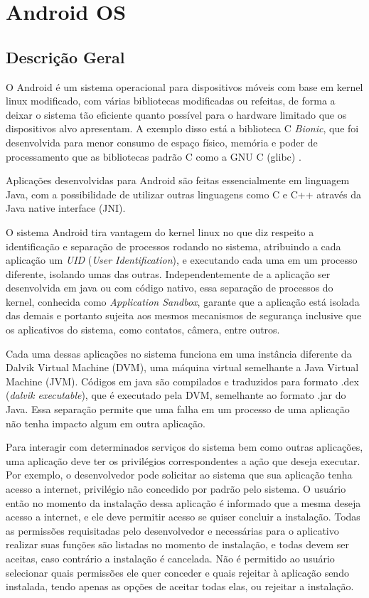 \chapter[Android OS]{Android OS\footnotemark}
\label{cap:android-os}

\section{Descrição Geral}
O Android é um sistema operacional para dispositivos móveis com base em kernel linux modificado, com várias bibliotecas modificadas ou refeitas, de forma a deixar o sistema tão eficiente quanto possível para o hardware limitado que os dispositivos alvo apresentam. A exemplo disso está a biblioteca C \textit{Bionic}, que foi desenvolvida para menor consumo de espaço físico, memória e poder de processamento que as bibliotecas padrão C como a GNU C (glibc) \cite{devos2014}. 

Aplicações desenvolvidas para Android são feitas essencialmente em linguagem Java, com a possibilidade de utilizar outras linguagens como C e C++ através da Java native interface (JNI). 

O sistema Android tira vantagem do kernel linux no que diz respeito a identificação e separação de processos rodando no sistema, atribuindo a cada aplicação um \textit{UID} (\textit{User Identification}), e executando cada uma em um processo diferente, isolando umas das outras.  Independentemente de a aplicação ser desenvolvida em java ou com código nativo, essa separação de processos do kernel, conhecida como \textit{Application Sandbox}, garante que a aplicação está isolada das demais e portanto sujeita aos mesmos mecanismos de segurança inclusive que os aplicativos do sistema, como contatos, câmera, entre outros. 

Cada uma dessas aplicações no sistema funciona em uma instância diferente da Dalvik Virtual Machine (DVM), uma máquina virtual semelhante a Java Virtual Machine (JVM). Códigos em java são compilados e traduzidos para formato .dex (\textit{dalvik executable}), que é executado pela DVM, semelhante ao formato .jar do Java. Essa separação permite que uma falha em um processo de uma aplicação não tenha impacto algum em outra aplicação. 

Para interagir com determinados serviços do sistema bem como outras aplicações, uma aplicação deve ter os privilégios correspondentes a ação que deseja executar. Por exemplo, o desenvolvedor pode solicitar ao sistema que sua aplicação tenha acesso a internet, privilégio não concedido por padrão pelo sistema. O usuário então no momento da instalação dessa aplicação é informado que a mesma deseja acesso a internet, e ele deve permitir acesso se quiser concluir a instalação. Todas as permissões requisitadas pelo desenvolvedor e necessárias para o aplicativo realizar suas funções são listadas no momento de instalação, e todas devem ser aceitas, caso contrário a instalação é cancelada. Não é permitido ao usuário selecionar quais permissões ele quer conceder e quais rejeitar à aplicação sendo instalada, tendo apenas as opções de aceitar todas elas, ou rejeitar a instalação. 

